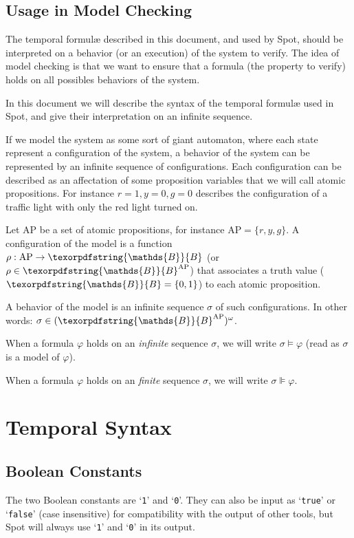 \documentclass[a4paper,twoside,10pt,DIV=12,draft]{scrreprt}
\newcommand{\B}{\texorpdfstring{\ensuremath{\mathds{B}}}{B}}
\newcommand{\AP}{\ensuremath{\mathrm{AP}}}
\newcommand{\0}{\texttt{0}}
\newcommand{\1}{\texttt{1}}
\newcommand\samp[1]{`\texttt{#1}'}
\begin{document}
\section{Usage in Model Checking}

The temporal formul\ae{} described in this document, and used by Spot,
should be interpreted on a behavior (or an execution) of the system to
verify.  The idea of model checking is that we want to ensure that a
formula (the property to verify) holds on all possibles behaviors of
the system.

In this document we will describe the syntax of the temporal
formul\ae{} used in Spot, and give their interpretation on an infinite
sequence.

If we model the system as some sort of giant automaton, where each
state represent a configuration of the system, a behavior of the
system can be represented by an infinite sequence of configurations.
Each configuration can be described as an affectation of some
proposition variables that we will call atomic propositions.  For
instance $r=1,y=0,g=0$ describes the configuration of a traffic light
with only the red light turned on.

Let $\AP$ be a set of atomic propositions, for instance
$\AP=\{r,y,g\}$.  A configuration of the model is a function
$\rho:\AP\to\B$ (or $\rho\in\B^\AP$) that associates a truth value
($\B=\{0,1\}$) to each atomic proposition.

A behavior of the model is an infinite sequence $\sigma$ of such
configurations.  In other words: $\sigma\in(\B^\AP)^\omega$.

When a formula $\varphi$ holds on an \emph{infinite} sequence $\sigma$, we
will write $\sigma \vDash \varphi$ (read as $\sigma$ is a model of
$\varphi$).

When a formula $\varphi$ holds on an \emph{finite} sequence $\sigma$, we
will write $\sigma \VDash \varphi$.

\chapter{Temporal Syntax}

\section{Boolean Constants}\label{sec:bool}

The two Boolean constants are \samp{1} and \samp{0}.  They can also be
input as \samp{true} or \samp{false} (case insensitive) for
compatibility with the output of other tools, but Spot will always use
\samp{1} and \samp{0} in its output.
\end{document}
